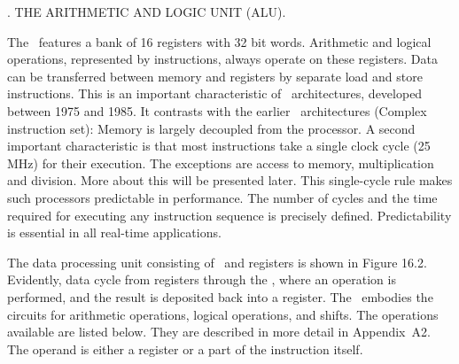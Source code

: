 . THE ARITHMETIC AND LOGIC UNIT (ALU).

The \ALU\ features a bank of 16 registers with 32 bit words. Arithmetic and logical operations, represented by instructions, always operate on these registers. Data can be transferred between memory and registers by separate load and store instructions. This is an important characteristic of \RISC\ architectures, developed between 1975 and 1985. It contrasts with the earlier \CISC\ architectures (Complex instruction set): Memory is largely decoupled from the processor. A second important characteristic is that most instructions take a single clock cycle (25 MHz) for their execution. The exceptions are access to memory, multiplication and division. More about this will be presented later. This single-cycle rule makes such processors predictable in performance. The number of cycles and the time required for executing any instruction sequence is precisely defined. Predictability is essential in all real-time applications.

The data processing unit consisting of \ALU\ and registers is shown in Figure 16.2. Evidently, data cycle from registers through the \ALU, where an operation is performed, and the result is deposited back into a register. The \ALU\ embodies the circuits for arithmetic operations, logical operations, and shifts. The operations available are listed below. They are described in more detail in Appendix~A2. The operand  is either a register or a part of the instruction itself.

\medskip
{}\medskip


